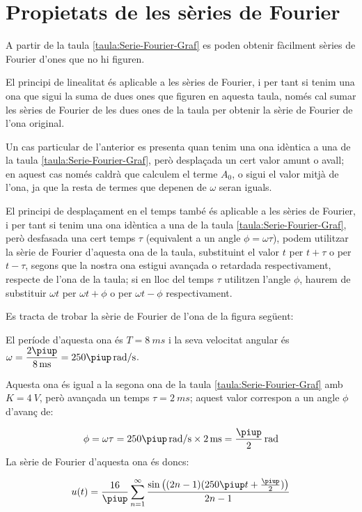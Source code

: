 \section{Propietats de les sèries de Fourier}

A partir de la taula \vref{taula:Serie-Fourier-Graf} es poden obtenir fàcilment sèries de Fourier d'ones que no hi figuren.

El principi de linealitat és aplicable a les sèries de Fourier, i per tant si tenim una ona que sigui la suma de dues ones que figuren en aquesta taula, només  cal sumar les sèries de Fourier de les dues ones de la taula per obtenir la sèrie de Fourier de l'ona original.

Un cas particular de l'anterior es presenta quan tenim una ona  idèntica a una de la taula \ref{taula:Serie-Fourier-Graf}, però desplaçada un cert valor amunt o avall; en aquest cas només caldrà que calculem el terme $A_0$, o sigui el valor mitjà de l'ona, ja que la resta de termes que depenen de $\omega$ seran iguals.

El principi de desplaçament en el temps també és aplicable a les sèries de Fourier, i per tant si tenim una ona idèntica a una de la taula \ref{taula:Serie-Fourier-Graf}, però desfasada una cert temps $\tau$ (equivalent a un angle $\phi = \omega \tau$), podem utilitzar la sèrie de Fourier d'aquesta ona de la taula, substituint el valor $t$ per $t+\tau$ o per $t-\tau$, segons que la nostra ona estigui avançada o retardada respectivament, respecte de l'ona de la taula; si en lloc del temps $\tau$ utilitzen l'angle $\phi$, haurem de substituir  $\omega t$ per $\omega t + \phi$ o per $\omega t - \phi$ respectivament.


\begin{exemple}
    Es tracta de trobar la sèrie de Fourier de l'ona de la figura següent:
    \begin{center}
        
    \end{center}

    El període d'aquesta ona és $T=\SI{8}{ms}$ i la seva velocitat angular és $\omega = \dfrac{2\piup}{\SI{8}{ms}} = 250 \piup\unit{rad/s}$.

    Aquesta ona és igual a la segona ona de la taula \vref{taula:Serie-Fourier-Graf} amb $K=\SI{4}{V}$, però avançada un temps $\tau=\SI{2}{ms}$; aquest valor correspon a un angle $\phi$ d'avanç de:

    \[
        \phi = \omega \tau = 250\piup\unit{rad/s} \times \SI{2}{ms} = \frac{\piup}{2}\unit{rad}
    \]
    La sèrie de Fourier d'aquesta ona és doncs:

    \[
    u(t) = \frac{{16}}{\piup }\sum\limits_{n = 1}^\infty  {\frac{{\sin \big((2n - 1)(250\piup t+ \frac{\piup}{2})\big)}}{{2n - 1}}}
    \]
\end{exemple}

